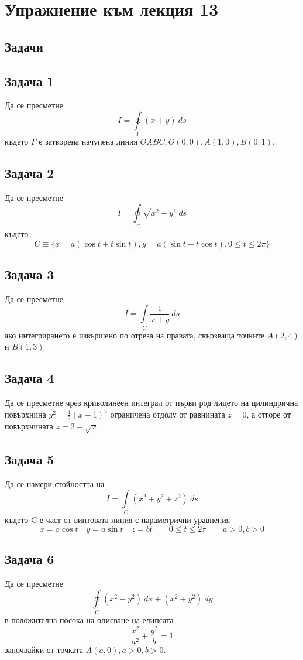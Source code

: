 \documentclass[a4paper,fleqn,12pt]{article}
\theoremstyle{definition}
\begin{document}
\newpage 
\section{Упражнение към лекция 13}

\subsection{Задачи}

\subsection*{Задача 1}
Да се пресметне 
$$I = \oint\limits_{\Gamma} (x+y) \ ds$$
където $\Gamma$ е затворена начупена линия $OABC, O(0,0), A(1,0), B(0,1)$.

\subsection*{Задача 2}
Да се пресметне 
$$I = \oint\limits_{C} \sqrt{x^2 + y^2} \ ds$$
където 
$$C \equiv \{x = a(\cos t + t \sin t), y = a(\sin t - t\cos t), 0 \leq t \leq 2\pi \}$$
 
\subsection*{Задача 3}
Да се пресметне 
$$I = \int\limits_{C} \frac{1}{x+y} \ ds$$
ако интегрирането е извършено по отреза на правата, свързваща точките $A(2,4)$ и $B(1,3)$
 
\subsection*{Задача 4}
Да се пресметне чрез криволинеен интеграл от първи род лицето на цилиндрична повърхнина
$y^2 = \frac{4}{9}(x-1)^3$ ограничена отдолу от равнината $z=0$, а отгоре от повърхнината $z = 2 - \sqrt{x}$.

\subsection*{Задача 5}
Да се намери стойността на 
$$I = \int\limits_{C}(x^2 + y^2 + z^2) \ ds$$
където C е част от винтовата линия с параметрични уравнения
$$x = a\cos t \quad y = a\sin t \quad z = bt \qquad 0 \leq t \leq 2\pi \qquad a>0,b>0$$

\subsection*{Задача 6}
Да се пресметне
$$\oint\limits_C (x^2-y^2) \ dx + (x^2+y^2) \ dy$$
в положителна посока на описване на елипсата 
$$\frac{x^2}{a^2} + \frac{y^2}{b} = 1$$
започвайки от точката $A(a,0), a>0, b>0$.
\end{document}
